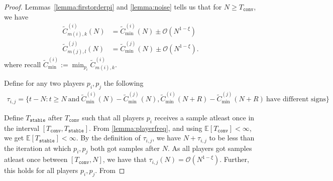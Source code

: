 \documentclass[10pt,a4paper]{amsart}
\newcommand{\E}{\mathbb{E}}
\begin{document}
\begin{proof}
    Lemmas~\ref{lemma:firstorderpi} and \ref{lemma:noise} tells us that for $N\geq T_{\texttt{conv}}$, we have
\begin{align*}
    \tilde{C}^{(i)}_{m(i),k}(N) &=\tilde{C}^{(i)}_{\min}(N) \pm \mathcal{O}\left(N^{1-\xi}\right)\\
    \tilde{C}^{(j)}_{m(j),l}(N) &= \tilde{C}^{(j)}_{\min}(N) \pm \mathcal{O}\left(N^{1-\xi}\right).
\end{align*}
where recall $\tilde{C}^{(i)}_{\min}:=\min_{p_i}\tilde{C}^{(i)}_{m(i),k}$.

Define for any two players $p_i,p_j$ the following
\begin{align*}
    \tau_{i,j} = \{t-N: t\geq N\ \text{and}\ \tilde{C}^{(i)}_{\min}(N)-\tilde{C}^{(j)}_{\min}(N), \tilde{C}^{(i)}_{\min}(N+R)-\tilde{C}^{(j)}_{\min}(N+R)\ \text{have different signs}\}
\end{align*}

Define $T_{\texttt{stable}}$ after $T_{\texttt{conv}}$ such that all players $p_i$ receives a sample atleast once in the interval $[T_{\texttt{conv}},T_{\texttt{stable}}]$. From \ref{lemma:playerfreq}, and using $\E[T_{\texttt{conv}}]<\infty$, we get $\E[T_{\texttt{stable}}]<\infty$. By the definition of $ \tau_{i,j}$, we have $N+ \tau_{i,j}$ to be less than the iteration at which $p_i,p_j$ both got samples after $N$. As all players got samples atleast once between $[T_{\texttt{conv}},N]$, we have that $\tau_{i,j}(N)=\mathcal{O}(N^{1-\xi})$. Further, this holds for all players $p_i,p_j$. From




\end{proof}
\end{document}
